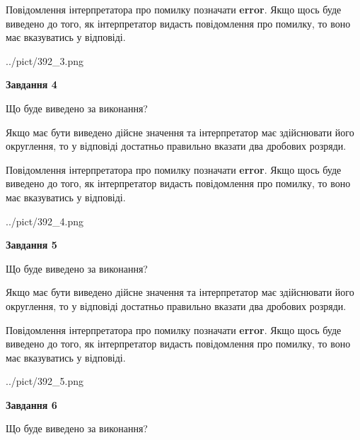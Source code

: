 \documentclass[12pt, ukrainian]{article}
\begin{document}
{\begin {Large}
Повідомлення інтерпретатора про помилку позначати \textbf{error}.
Якщо щось буде виведено до того, як інтерпретатор видасть повідомлення про помилку, 
то воно має вказуватись у відповіді. \par

\begin{center}
	{../pict/392_3.png}
\end{center}
\newpage

{\begin {center}\textbf{Завдання 4}\end {center}}\par
Що буде виведено за виконання? \par

Якщо має бути виведено дійсне значення та інтерпретатор має здійснювати його округлення, 
то у відповіді достатньо правильно вказати два дробових розряди.

Повідомлення інтерпретатора про помилку позначати \textbf{error}.
Якщо щось буде виведено до того, як інтерпретатор видасть повідомлення про помилку, 
то воно має вказуватись у відповіді. \par

\begin{center}
	{../pict/392_4.png}
\end{center}
\newpage

{\begin {center}\textbf{Завдання 5}\end {center}}\par
Що буде виведено за виконання? \par

Якщо має бути виведено дійсне значення та інтерпретатор має здійснювати його округлення, 
то у відповіді достатньо правильно вказати два дробових розряди.

Повідомлення інтерпретатора про помилку позначати \textbf{error}.
Якщо щось буде виведено до того, як інтерпретатор видасть повідомлення про помилку, 
то воно має вказуватись у відповіді. \par

\begin{center}
	{../pict/392_5.png}
\end{center}
\newpage

{\begin {center}\textbf{Завдання 6}\end {center}}\par
Що буде виведено за виконання? \par


\end{Large}}
\end{document}

